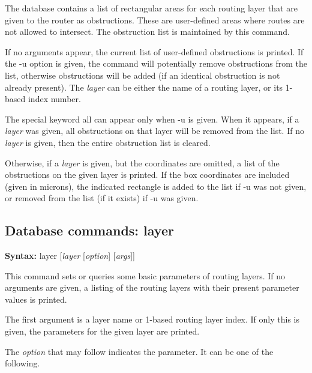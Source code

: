 The database contains a list of rectangular areas for each routing
layer that are given to the router as obstructions.  These are
user-defined areas where routes are not allowed to intersect.  The
obstruction list is maintained by this command.

If no arguments appear, the current list of user-defined obstructions
is printed.  If the {\vt -u} option is given, the command will
potentially remove obstructions from the list, otherwise obstructions
will be added (if an identical obstruction is not already present). 
The {\it layer} can be either the name of a routing layer, or its
1-based index number.

The special keyword {\vt all} can appear only when {\vt -u} is given.
When it appears, if a {\it layer} was given, all obstructions on that
layer will be removed from the list.  If no {\it layer} is given,
then the entire obstruction list is cleared.

Otherwise, if a {\it layer} is given, but the coordinates are omitted,
a list of the obstructions on the given layer is printed.  If the box
coordinates are included (given in microns), the indicated rectangle
is added to the list if {\vt -u} was not given, or removed from the
list (if it exists) if {\vt -u} was given.

\subsection{Database commands: {\vt layer}}

{\bf Syntax:} {\vt layer} [{\it layer} [{\it option\/}] [{\it args\/}]]

This command sets or queries some basic parameters of routing layers. 
If no arguments are given, a listing of the routing layers with their
present parameter values is printed.

The first argument is a layer name or 1-based routing layer index.  If
only this is given, the parameters for the given layer are printed.

The {\it option} that may follow indicates the parameter.  It can be
one of the following.

